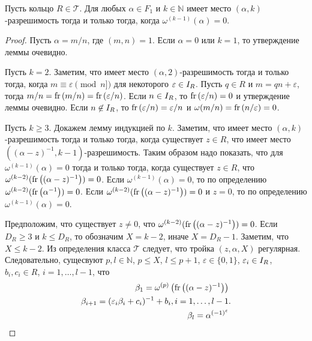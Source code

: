 \documentclass[_00_dissertation.tex]{subfiles}
\begin{document}
\begin{lemma}\label{lemma:omega_and_euclidean_algorithm}
    Пусть кольцо $R \in \mathcal{T}$.
    Для любых $\alpha \in F_1$ и $k \in \mathbb{N}$ имеет место $(\alpha, k)$-разрешимость тогда и только тогда, когда $\omega^{(k-1)}(\alpha) = 0$.
\end{lemma}
\begin{proof}
    Пусть $\alpha = m/n$, где $(m, n) = 1$.
    Если $\alpha = 0$ или $k = 1$, то утверждение леммы очевидно.

    Пусть $k = 2$.
    Заметим, что имеет место $(\alpha, 2)$-разрешимость тогда и только тогда, когда $m \equiv \varepsilon \pmod{n]}$ для некоторого $\varepsilon \in I_{R}$.
    Пусть $q \in R$ и $m = qn + \varepsilon$, тогда $m/n = \textrm{fr}\left(m/n\right) = \textrm{fr}\left(\varepsilon/n\right)$.
    Если $n \in I_{R}$, то $\textrm{fr}\left(\varepsilon/n\right) = 0$ и утверждение леммы очевидно.
    Если $n \not\in I_{R}$, то $\textrm{fr}\left(\varepsilon/n\right) = \varepsilon/n$ и $\omega(m/n) = \textrm{fr}\left(n/\varepsilon\right) = 0$.

    Пусть $k \ge 3$.
    Докажем лемму индукцией по $k$.
    Заметим, что имеет место $(\alpha, k)$-разрешимость тогда и только тогда, когда существует $z \in R$, что имеет место $((\alpha - z)^{-1}, k-1)$-разрешимость.
    Таким образом надо показать, что для $\omega^{(k-1)}(\alpha) = 0$ тогда и только тогда, когда существует $z \in R$, что $\omega^{(k-2)}(\textrm{fr}\left((\alpha - z)^{-1}\right)) = 0$.
    Если $\omega^{(k-1)}(\alpha) = 0$, то по определению $\omega^{(k-2)}(\textrm{fr}\left(\alpha^{-1}\right)) = 0$.
    Если $\omega^{(k-2)}(\textrm{fr}\left((\alpha - z)^{-1}\right)) = 0$ и $z = 0$, то по определению $\omega^{(k-1)}(\alpha) = 0$.

    Предположим, что существует $z \neq 0$, что $\omega^{(k-2)}(\textrm{fr}\left((\alpha - z)^{-1}\right)) = 0$.
    Если $D_R \ge 3$ и $k \le D_R$, то обозначим $X = k-2$, иначе $X = D_R - 1$.
    Заметим, что $X \le k-2$.
    Из определения класса $\mathcal{T}$ следует, что тройка $(z, \alpha, X)$ регулярная.
    Следовательно, сущесвуют $p, l \in \mathbb{N}$, $p \le X$, $l \le p+1$, $\varepsilon \in \{0, 1\}$, $\varepsilon_i \in I_{R}$, $b_i, c_i \in R$, $i = 1, \dots, l-1$, что
    \begin{equation*}
        \begin{split}
            \beta_1 = \omega^{(p)}\left(\textrm{fr}\left((\alpha - z)^{-1}\right)\right)\\
            \beta_{i+1} = (\varepsilon_i \beta_i + c_i)^{-1} + b_i, i = 1, \dots, l-1\\
            \beta_{l} = \alpha^{(-1)^{\varepsilon}}
        \end{split}.
    \end{equation*}


\end{proof}
\end{document}
